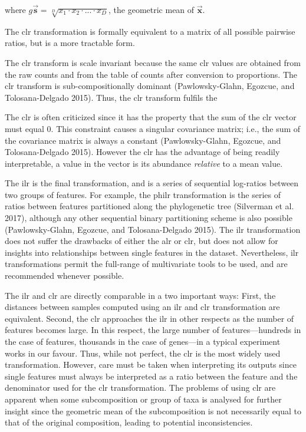 \documentclass[onecolumn]{article}
\newcommand{\vect}[1]{\vec{\textbf{#1}}}
\begin{document}
where \(g\vect{s} = \sqrt[D]{x_1 \cdot x_2 \cdot ... \cdot x_D}\), the geometric mean of \(\vec{\textbf{x}}\).

The clr transformation is formally equivalent to a matrix of all possible pairwise ratios, but is a more tractable form.

The clr transform is scale invariant because the same clr values are obtained from the raw counts and from the table of counts after conversion to proportions. The clr transform is sub-compositionally dominant (Pawlowsky-Glahn, Egozcue, and Tolosana-Delgado 2015). Thus, the clr transform fulfils the

The clr is often criticized since it has the property that the sum of the clr vector must equal 0. This constraint causes a singular covariance matrix; i.e., the sum of the covariance matrix is always a constant (Pawlowsky-Glahn, Egozcue, and Tolosana-Delgado 2015). However the clr has the advantage of being readily interpretable, a value in the vector is its abundance \emph{relative} to a mean value.

The ilr is the final transformation, and is a series of sequential log-ratios between two groups of features. For example, the philr transformation is the series of ratios between features partitioned along the phylogenetic tree (Silverman et al. 2017), although any other sequential binary partitioning scheme is also possible (Pawlowsky-Glahn, Egozcue, and Tolosana-Delgado 2015). The ilr transformation does not suffer the drawbacks of either the alr or clr, but does not allow for insights into relationships between single features in the dataset. Nevertheless, ilr transformations permit the full-range of multivariate tools to be used, and are recommended whenever possible.

The ilr and clr are directly comparable in a two important ways: First, the distances between samples computed using an ilr and clr transformation are equivalent. Second, the clr approaches the ilr in other respects as the number of features becomes large. In this respect, the large number of features---hundreds in the case of features, thousands in the case of genes---in a typical experiment works in our favour. Thus, while not perfect, the clr is the most widely used transformation. However, care must be taken when interpreting its outputs since single features must always be interpreted as a ratio between the feature and the denominator used for the clr transformation. The problems of using clr are apparent when some subcomposition or group of taxa is analysed for further insight since the geometric mean of the subcomposition is not necessarily equal to that of the original composition, leading to potential inconsistencies.
\end{document}

